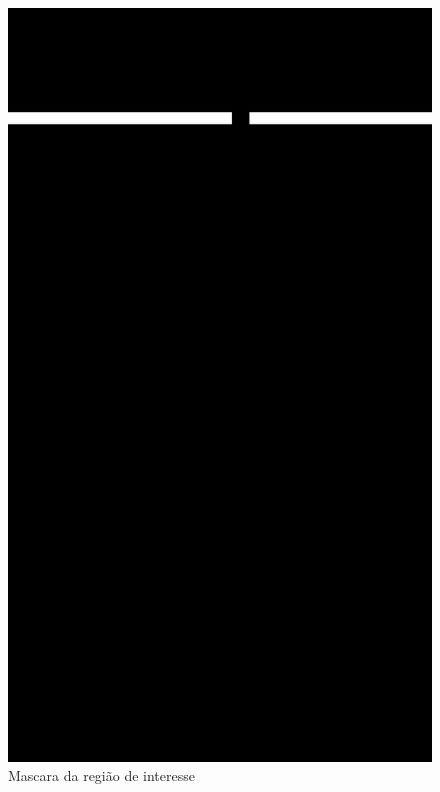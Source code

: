 \begin{figure}[H]
    \centering
    \caption{Mascara da região de interesse}
        \begin{minipage}{\sizeImg\textwidth}
            \includegraphics[width=\textwidth]{figuras/mao_barra/mask3.png}
        \end{minipage}
    \label{fig:mask}
\end{figure}





